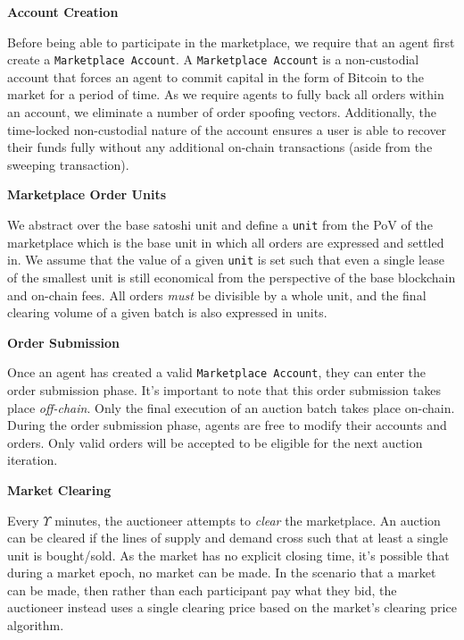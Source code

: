 \documentclass[10pt,a4paper]{article}
\theoremstyle{definition}
\begin{document}
\begin{center}
    \textbf{Account Creation}
\end{center}

Before being able to participate in the marketplace, we require that an agent
first create a \texttt{Marketplace Account}. A \texttt{Marketplace Account} is
a non-custodial account that forces an agent to commit capital in the form of
Bitcoin to the market for a period of time. As we require agents to fully back
all orders within an account, we eliminate a number of order spoofing vectors.
Additionally, the time-locked non-custodial nature of the account ensures a user
is able to recover their funds fully without any additional on-chain
transactions (aside from the sweeping transaction).

\begin{center}
    \textbf{Marketplace Order Units}
\end{center}

We abstract over the base satoshi unit and define a \texttt{unit} from the PoV
of the marketplace which is the base unit in which all orders are expressed and
settled in. We assume that the value of a given \texttt{unit} is set such that
even a single lease of the smallest unit is still economical from the
perspective of the base blockchain and on-chain fees. All orders \emph{must} be
divisible by a whole unit, and the final clearing volume of a given batch is
also expressed in units.

\begin{center}
    \textbf{Order Submission}
\end{center}

Once an agent has created a valid \texttt{Marketplace Account}, they can enter
the order submission phase. It's important to note that this order submission
takes place \emph{off-chain}. Only the final execution of an auction batch
takes place on-chain. During the order submission phase, agents are free to
modify their accounts and orders. Only valid orders will be accepted to be
eligible for the next auction iteration.

\begin{center}
    \textbf{Market Clearing}
\end{center}

Every $\Upsilon$ minutes, the auctioneer attempts to \emph{clear} the marketplace.
An auction can be cleared if the lines of supply and demand cross such that at
least a single unit is bought/sold. As the market has no explicit closing time,
it's possible that during a market epoch, no market can be made. In the
scenario that a market can be made, then rather than each participant pay what
they bid, the auctioneer instead uses a single clearing price based on the
market's clearing price algorithm.
\end{document}
